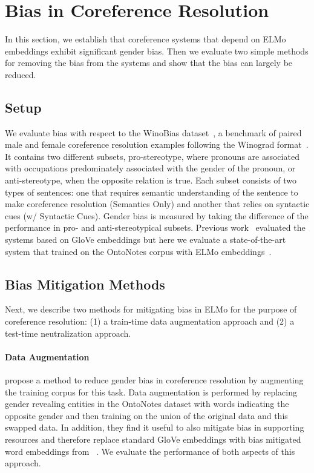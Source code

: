 \documentclass[11pt,a4paper]{article}
\begin{document}
\section{Bias in Coreference Resolution}
In this section, we establish that coreference systems that depend on ELMo embeddings exhibit significant gender bias.
Then we evaluate two simple methods for removing the bias from the systems and show that the bias can largely be reduced.

\subsection{Setup} We evaluate bias with respect to the WinoBias dataset~\cite{ZWYOC18}, a benchmark of paired male and female coreference resolution examples following the Winograd format~\cite{hirst,RahmanNg12c,peng2015solving}.
It contains two different subsets, pro-stereotype, where pronouns are associated with occupations predominately associated with the gender of the pronoun, or anti-stereotype, when the opposite relation is true.
Each subset consists of two types of sentences: one that requires semantic understanding of the sentence to make coreference resolution (Semantics Only) and another that relies on syntactic cues (w/ Syntactic Cues).
Gender bias is measured by taking the difference of the performance in pro- and anti-stereotypical subsets.
Previous work~\cite{ZWYOC18} evaluated the systems based on GloVe embeddings but here we evaluate a state-of-the-art system that trained on the OntoNotes corpus with ELMo embeddings~\cite{lee2018higher}.

\subsection{Bias Mitigation Methods}
Next, we describe two methods for mitigating bias in ELMo for the purpose of coreference resolution: (1) a train-time data augmentation approach and (2) a test-time neutralization approach.

\paragraph{Data Augmentation}
\label{sec:debias}
\citet{ZWYOC18} propose a method to reduce gender bias in coreference resolution by augmenting the training corpus for this task.
Data augmentation is performed by replacing gender revealing entities in the OntoNotes dataset with words indicating the opposite gender and then training on the union of the original data and this swapped data.
In addition, they find it useful to also mitigate bias in supporting resources and therefore replace standard GloVe embeddings with bias mitigated word embeddings from ~.
We evaluate the performance of both aspects of this approach.
\end{document}
